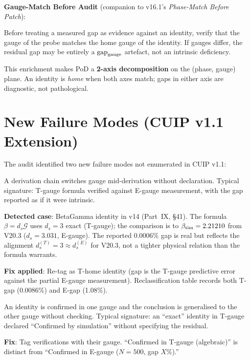 \documentclass[12pt, a4paper]{article}
\begin{document}
\begin{keybox}[title={Operational Companion Rule}]
\textbf{Gauge-Match Before Audit} (companion to v16.1's
\textit{Phase-Match Before Patch}):

Before treating a measured gap as evidence against an identity, verify that
the gauge of the probe matches the home gauge of the identity. If gauges
differ, the residual gap may be entirely a $\text{gap}_{\rm gauge}$ artefact,
not an intrinsic deficiency.
\end{keybox}

This enrichment makes PoD a \textbf{2-axis decomposition} on the (phase, gauge)
plane. An identity is \textit{home} when both axes match; gaps in either axis
are diagnostic, not pathological.

\section{New Failure Modes (CUIP v1.1 Extension)}

The audit identified two new failure modes not enumerated in CUIP v1.1:

\begin{openqbox}[title={Failure 7: Silent Gauge Drift}]
A derivation chain switches gauge mid-derivation without declaration. Typical
signature: T-gauge formula verified against E-gauge measurement, with the gap
reported as if it were intrinsic.

\textbf{Detected case}: BetaGamma identity in v14 (Part~IX, §41). The formula
$\beta = d_s\mathcal{G}$ uses $d_s = 3$ exact (T-gauge); the comparison is to
$\beta_{\rm sim} = 2.21210$ from V20.3 ($d_s = 3.031$, E-gauge). The reported
0.0006\% gap is real but reflects the alignment $d_s^{(T)} = 3 \approx d_s^{(E)}$
for V20.3, not a tighter physical relation than the formula warrants.

\textbf{Fix applied}: Re-tag as T-home identity (gap is the T-gauge predictive
error against the partial E-gauge measurement). Reclassification table records
both T-gap (0.0086\%) and E-gap (1.08\%).
\end{openqbox}

\begin{openqbox}[title={Failure 8: Gauge-Conflated Verification}]
An identity is confirmed in one gauge and the conclusion is generalised to
the other gauge without checking. Typical signature: an ``exact'' identity in
T-gauge declared ``Confirmed by simulation'' without specifying the residual.

\textbf{Fix}: Tag verifications with their gauge. ``Confirmed in T-gauge
(algebraic)'' is distinct from ``Confirmed in E-gauge ($N=500$, gap $X\%$).''
\end{openqbox}
\end{document}
